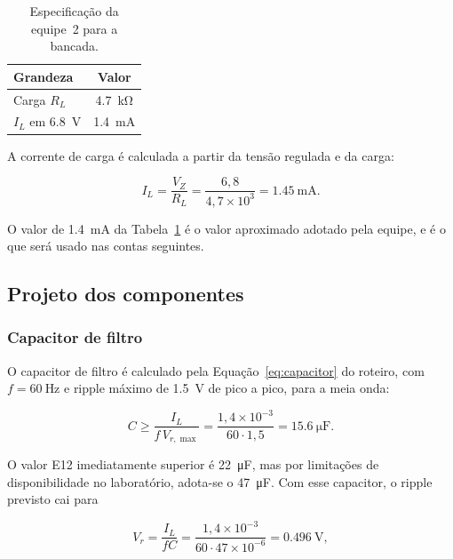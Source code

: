 \documentclass[11pt,a4paper]{article}
\begin{document}
\begin{table}[h]
\centering
\caption{Especificação da equipe~2 para a bancada.}
\label{tab:equipe_r5}
\begin{tabular}{lc}
\hline
Grandeza & Valor \\
\hline
Carga $R_L$ & \SI{4,7}{\kilo\ohm} \\
$I_L$ em \SI{6,8}{\volt} & \SI{1,4}{\milli\ampere} \\
\hline
\end{tabular}
\end{table}
 
A corrente de carga é calculada a partir da tensão regulada e da carga:
 
\begin{equation}
I_L = \frac{V_Z}{R_L} = \frac{6{,}8}{4{,}7 \times 10^3} = \SI{1,45}{\milli\ampere} .
\label{eq:il_equipe}
\end{equation}
 
O valor de \SI{1,4}{\milli\ampere} da Tabela~\ref{tab:equipe_r5} é o valor aproximado adotado pela equipe, e é o que será usado nas contas seguintes.
 
\subsection{Projeto dos componentes}
 
\subsubsection{Capacitor de filtro}
 
O capacitor de filtro é calculado pela Equação~\eqref{eq:capacitor} do roteiro, com $f = \SI{60}{\hertz}$ e ripple máximo de \SI{1,5}{\volt} de pico a pico, para a meia onda:
 
\begin{equation}
C \geq \frac{I_L}{f \, V_{r,\max}} = \frac{1{,}4 \times 10^{-3}}{60 \cdot 1{,}5} = \SI{15,6}{\micro\farad} .
\label{eq:capacitor_equipe}
\end{equation}
 
O valor E12 imediatamente superior é \SI{22}{\micro\farad}, mas por limitações de disponibilidade no laboratório, adota-se o \SI{47}{\micro\farad}. Com esse capacitor, o ripple previsto cai para
 
\begin{equation}
V_r = \frac{I_L}{f C} = \frac{1{,}4 \times 10^{-3}}{60 \cdot 47 \times 10^{-6}} = \SI{0,496}{\volt} ,
\label{eq:ripple_equipe}
\end{equation}
 
\end{document}
